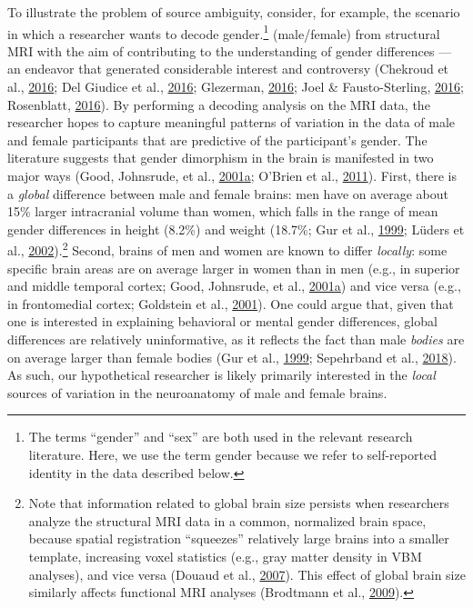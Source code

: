 \documentclass[11pt,american,]{memoir} %
\let\rmarkdownfootnote\footnote%
\def\footnote{\protect\rmarkdownfootnote}
\begin{document}
To illustrate the problem of source ambiguity, consider, for example, the scenario in which a researcher wants to decode gender.\footnote{The terms ``gender'' and ``sex'' are both used in the relevant research literature. Here, we use the term gender because we refer to self-reported identity in the data described below.} (male/female) from structural MRI with the aim of contributing to the understanding of gender differences --- an endeavor that generated considerable interest and controversy (Chekroud et al., \protect\hyperlink{ref-Chekroud2016-tc}{2016}; Del Giudice et al., \protect\hyperlink{ref-Del_Giudice2016-ns}{2016}; Glezerman, \protect\hyperlink{ref-Glezerman2016-xl}{2016}; Joel \& Fausto-Sterling, \protect\hyperlink{ref-Joel2016-uo}{2016}; Rosenblatt, \protect\hyperlink{ref-Rosenblatt2016-oy}{2016}). By performing a decoding analysis on the MRI data, the researcher hopes to capture meaningful patterns of variation in the data of male and female participants that are predictive of the participant's gender. The literature suggests that gender dimorphism in the brain is manifested in two major ways (Good, Johnsrude, et al., \protect\hyperlink{ref-Good2001-ak}{2001}\protect\hyperlink{ref-Good2001-ak}{a}; O'Brien et al., \protect\hyperlink{ref-OBrien2011-lj}{2011}). First, there is a \emph{global} difference between male and female brains: men have on average about 15\% larger intracranial volume than women, which falls in the range of mean gender differences in height (8.2\%) and weight (18.7\%; Gur et al., \protect\hyperlink{ref-Gur1999-qj}{1999}; Lüders et al., \protect\hyperlink{ref-Luders2002-ms}{2002}).\footnote{Note that information related to global brain size persists when researchers analyze the structural MRI data in a common, normalized brain space, because spatial registration ``squeezes'' relatively large brains into a smaller template, increasing voxel statistics (e.g., gray matter density in VBM analyses), and vice versa (Douaud et al., \protect\hyperlink{ref-Douaud2007-sw}{2007}). This effect of global brain size similarly affects functional MRI analyses (Brodtmann et al., \protect\hyperlink{ref-brodtmann2009regional}{2009}).} Second, brains of men and women are known to differ \emph{locally}: some specific brain areas are on average larger in women than in men (e.g., in superior and middle temporal cortex; Good, Johnsrude, et al., \protect\hyperlink{ref-Good2001-ak}{2001}\protect\hyperlink{ref-Good2001-ak}{a}) and vice versa (e.g., in frontomedial cortex; Goldstein et al., \protect\hyperlink{ref-Goldstein2001-dy}{2001}). One could argue that, given that one is interested in explaining behavioral or mental gender differences, global differences are relatively uninformative, as it reflects the fact than male \emph{bodies} are on average larger than female bodies (Gur et al., \protect\hyperlink{ref-Gur1999-qj}{1999}; Sepehrband et al., \protect\hyperlink{ref-Sepehrband2018-dy}{2018}). As such, our hypothetical researcher is likely primarily interested in the \emph{local} sources of variation in the neuroanatomy of male and female brains.
\end{document}
